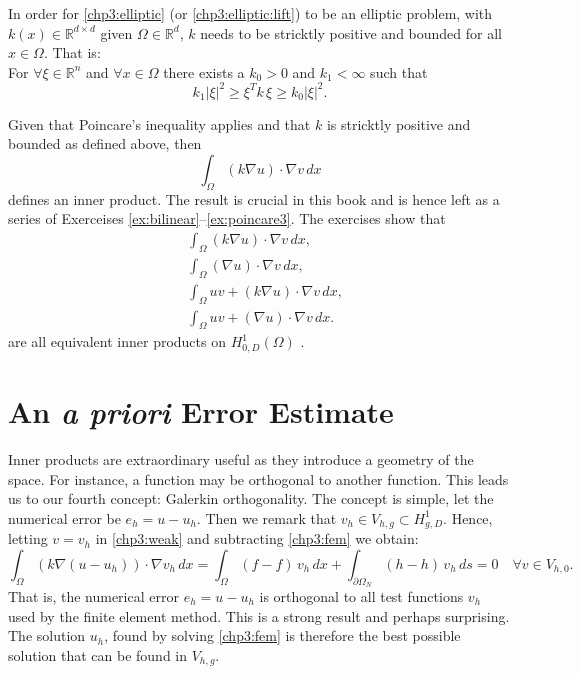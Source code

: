 In order for \eqref{chp3:elliptic} (or \eqref{chp3:elliptic:lift}) to be an elliptic problem, with  $k(x) \in \mathbb{R}^{d\times d}$ given $\Omega\in \mathbb{R}^d$,  
$k$ needs to be stricktly positive and bounded for all $x\in \Omega$. That is: \\  
For $\forall \xi\in \mathbb{R}^n$ and $\forall x \in \Omega$ there exists a $k_0 > 0$ and $k_1 < \infty$ such that 
\[
k_1 |\xi|^2  \ge    \xi^T k \, \xi \ge k_0 |\xi|^2 .   
\]

Given that Poincare's inequality applies and that $k$ is stricktly positive and bounded as defined above, then 
\[
\int_\Omega (k \nabla u) \cdot \nabla v \, dx 
\]
defines an inner product. The result is crucial in this book and is hence left as a series of Exerceises \ref{ex:bilinear}--\ref{ex:poincare3}.  
The exercises show that
\begin{align}
	&\int_\Omega (k \nabla u) \cdot \nabla v \, dx,  \\  
	&\int_\Omega (\nabla u) \cdot \nabla v \, dx,  \\ 
	&\int_\Omega u v + (k \nabla u) \cdot \nabla v \, dx,  \\ 
	&\int_\Omega u v + ( \nabla u) \cdot \nabla v \, dx .  
\end{align}
are all equivalent inner products on $H^1_{0, D}(\Omega)$ . 

\section{An \emph{a priori} Error Estimate}

Inner products are extraordinary useful as they introduce a geometry of the space. For instance, 
a function may be orthogonal to another function. This leads us to our fourth concept: 
Galerkin orthogonality. The concept is simple, let the numerical error be $e_h = u - u_h$. Then we
remark that $v_h \in V_{h,g} \subset H^1_{g, D}$. Hence, letting 
$v=v_h$ in \eqref{chp3:weak} and subtracting \eqref{chp3:fem} we obtain:   
\begin{equation}
\label{chp3:orth}
	\int_\Omega (k \nabla (u -  u_h)) \cdot \nabla v_h \, dx = \int_\Omega (f -f) \, v_h \, dx + \int_{\partial \Omega_N} (h -h)  \, v_h \, ds = 0 \quad    \forall v\in  V_{h, 0} .  
\end{equation}
That is, the numerical error $e_h = u - u_h$ is orthogonal to all test functions $v_h$ used by the finite element method. This is a strong result and
perhaps surprising. The solution $u_h$, found by solving \eqref{chp3:fem} is therefore the best possible solution that can be found in $V_{h, g}$.   

